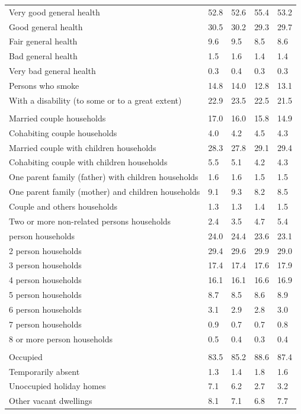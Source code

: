 \documentclass{article}
\begin{document}
\begin{table}[h]
\begin{tabular}{KTTTT}
    \hline
Very good general health & 52.8& 52.6&55.4& 53.2\\
Good general health & 30.5& 30.2& 29.3& 29.7\\
Fair general health & 9.6& 9.5&8.5& 8.6\\
Bad general health & 1.5& 1.6&1.4& 1.4\\
Very bad general health & 0.3& 0.4&0.3& 0.3\\
    \hline
Persons who smoke & 14.8& 14.0&12.8& 13.1\\
    \hline
With a disability (to some or to a great extent) & 22.9& 23.5&22.5& 21.5\\
\hline
    \\ 
    \hline
Married couple households & 17.0& 16.0& 15.8& 14.9\\
Cohabiting couple households & 4.0& 4.2& 4.5& 4.3\\
Married couple with children households & 28.3& 27.8& 29.1& 29.4\\
Cohabiting couple with children households & 5.5& 5.1& 4.2& 4.3\\
One parent family (father) with  children households & 1.6& 1.6& 1.5& 1.5\\
One parent family (mother) and children households & 9.1& 9.3& 8.2& 8.5\\
Couple and others households  & 1.3& 1.3& 1.4& 1.5\\
Two or more non-related persons households & 2.4& 3.5& 4.7& 5.4\\
     person households & 24.0& 24.4& 23.6& 23.1\\
2 person households & 29.4& 29.6& 29.9& 29.0\\
3 person households & 17.4& 17.4& 17.6& 17.9\\
4 person households & 16.1& 16.1& 16.6& 16.9\\
5 person households & 8.7& 8.5& 8.6& 8.9\\
6 person households & 3.1& 2.9& 2.8& 3.0\\
7 person households & 0.9& 0.7& 0.7& 0.8\\
8 or more person households & 0.5& 0.4& 0.3& 0.4\\
\hline
    \\ 
    \hline
Occupied & 83.5& 85.2& 88.6& 87.4\\
Temporarily absent & 1.3& 1.4& 1.8& 1.6\\
Unoccupied holiday homes & 7.1& 6.2& 2.7& 3.2\\
Other vacant dwellings & 8.1& 7.1& 6.8& 7.7\\
\hline
\end{tabular}
\end{table}
\end{document}
